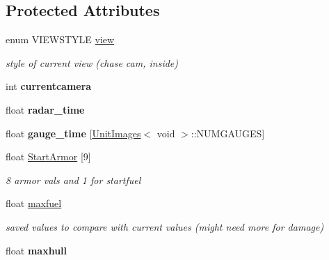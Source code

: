 \subsection*{Protected Attributes}
\begin{DoxyCompactItemize}
\item 
enum V\+I\+E\+W\+S\+T\+Y\+LE \hyperlink{classCockpit_ab782766f007eec4072d5e5c0da573553}{view}\hypertarget{classCockpit_ab782766f007eec4072d5e5c0da573553}{}\label{classCockpit_ab782766f007eec4072d5e5c0da573553}

\begin{DoxyCompactList}\small\item\em style of current view (chase cam, inside) \end{DoxyCompactList}\item 
int {\bfseries currentcamera}\hypertarget{classCockpit_a5dafef9fc211d69d8f9238193dec16cb}{}\label{classCockpit_a5dafef9fc211d69d8f9238193dec16cb}

\item 
float {\bfseries radar\+\_\+time}\hypertarget{classCockpit_ad303bb6fe3139f939aa8ea65e9a0d604}{}\label{classCockpit_ad303bb6fe3139f939aa8ea65e9a0d604}

\item 
float {\bfseries gauge\+\_\+time} \mbox{[}\hyperlink{structUnitImages}{Unit\+Images}$<$ void $>$\+::N\+U\+M\+G\+A\+U\+G\+ES\mbox{]}\hypertarget{classCockpit_afe53cbd357a95fb5c86a6222d6d8a7dd}{}\label{classCockpit_afe53cbd357a95fb5c86a6222d6d8a7dd}

\item 
float \hyperlink{classCockpit_aa38272d3115d052d2c80bed75b97a12f}{Start\+Armor} \mbox{[}9\mbox{]}
\begin{DoxyCompactList}\small\item\em 8 armor vals and 1 for startfuel \end{DoxyCompactList}\item 
float \hyperlink{classCockpit_a6546ea5815cfe3d734437f78a3a64473}{maxfuel}\hypertarget{classCockpit_a6546ea5815cfe3d734437f78a3a64473}{}\label{classCockpit_a6546ea5815cfe3d734437f78a3a64473}

\begin{DoxyCompactList}\small\item\em saved values to compare with current values (might need more for damage) \end{DoxyCompactList}\item 
float {\bfseries maxhull}\hypertarget{classCockpit_a3249aee890a7f50fa2750ce146a64baa}{}\label{classCockpit_a3249aee890a7f50fa2750ce146a64baa}


\end{DoxyCompactItemize}
